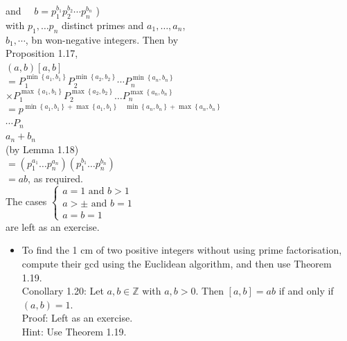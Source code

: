 \documentclass[10pt]{article}
\begin{document}
and $\quad b=p_{1}^{b_{1}} p_{2}^{b_{2}} \cdots p_{n}^{b_{n}}$ )\\
with $p_{1}, \ldots p_{n}$ distinct primes and $a_{1}, \ldots, a_{n}$,\\
$b_{1}, \cdots$, bn won-negative integers. Then by\\
Proposition 1.17,\\
$(a, b)[a, b]$\\
$=P_{1}^{\min \left\{a_{1}, b_{1}\right\}} P_{2}^{\min \left\{a_{2}, b_{2}\right\}} \cdots P_{n}^{\min \left\{a_{n}, b_{n}\right\}}$\\
$\times P_{1}^{\max \left\{a_{1}, b_{1}\right\}} P_{2}^{\max \left\{a_{2}, b_{2}\right\}} \ldots P_{n}^{\max \left\{a_{n}, b_{n}\right\}}$\\
$=p^{\min \left\{a_{1}, b_{1}\right\}+\max \left\{a_{1}, b_{1}\right\} \quad \min \left\{a_{n}, b_{n}\right\}+\max \left\{a_{n}, b_{n}\right\}}$\\
$\cdots P_{n}$\\
$a_{n}+b_{n}$\\
(by Lemma 1.18)\\
$=\left(p_{1}^{a_{1}} \ldots p_{n}^{a_{n}}\right)\left(p_{1}^{b_{1}} \ldots p_{n}^{b_{n}}\right)$\\
$=a b$, as required.\\
The cases $\left\{\begin{array}{l}a=1 \text { and } b>1 \\ a> \pm \text { and } b=1 \\ a=b=1\end{array}\right.$\\
are left as an exercise.

\begin{itemize}
  \item To find the 1 cm of two positive integers without using prime factorisation, compute their gcd using the Euclidean algorithm, and then use Theorem 1.19.\\
Conollary 1.20: Let $a, b \in \mathbb{Z}$ with $a, b>0$. Then $[a, b]=a b$ if and only if $(a, b)=1$.\\
Proof: Left as an exercise.\\
Hint: Use Theorem 1.19.
\end{itemize}
\end{document}
